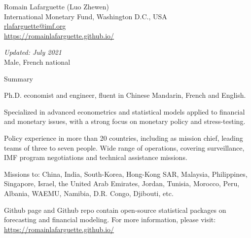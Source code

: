 \documentclass[usegeometry, 10pt, a4paper]{cv} %
\begin{document}
\hspace{10mm}
\begin{chapeau}
\begin{adresse}
\begin{flushleft}
    Romain Lafarguette (Luo Zhewen)\\
    International Monetary Fund, Washington D.C., USA \\
    \href{mailto:rlafarguette@imf.org}{rlafarguette@imf.org}\\
    \url{https://romainlafarguette.github.io/} \\
\end{flushleft}
\end{adresse}
\begin{etatcivil}
\begin{flushleft}
  \emph{Updated: July 2021}\\
Male, French national
\end{flushleft}
\end{etatcivil}
\end{chapeau}


\begin{rubriquetableau}[0.95\textwidth]{Summary}\\
  \vspace{-0.5cm}

\noindent Ph.D. economist and engineer, fluent in Chinese Mandarin, French and English.\\

\smallskip

\noindent Specialized in advanced econometrics and statistical models applied to
financial and monetary issues, with a strong focus on monetary policy and
stress-testing.\\ 

\smallskip

\noindent Policy experience in more than 20 countries, including as mission chief,
leading teams of  three to seven people.  Wide range  of operations, covering
surveillance, IMF program negotiations and technical assistance missions.\\

\smallskip

\noindent Missions to: China, India, South-Korea, Hong-Kong SAR, Malaysia,
Philippines,  Singapore, Israel,  the United  Arab Emirates,  Jordan, Tunisia,
Morocco, Peru, Albania, WAEMU, Namibia, D.R. Congo, Djibouti, etc.\\

\smallskip

\noindent Github page and Github repo contain open-source statistical packages on
forecasting and financial modeling. For more information, please visit:   
\url{https://romainlafarguette.github.io/} \\

\smallskip
\end{rubriquetableau}
\end{document}
